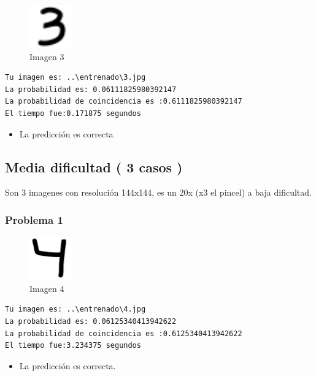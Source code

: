 \documentclass[
  spanish,
]{article}
\providecommand{\tightlist}{%
  \setlength{\itemsep}{0pt}\setlength{\parskip}{0pt}}
\begin{document}
\begin{figure}
\centering
\includegraphics[width=0.72917in,height=\textheight]{documentacion/img/3.png}
\caption{Imagen 3}
\end{figure}

\begin{verbatim}
Tu imagen es: ..\entrenado\3.jpg
La probabilidad es: 0.06111825980392147
La probabilidad de coincidencia es :0.6111825980392147
El tiempo fue:0.171875 segundos
\end{verbatim}

\begin{itemize}
\tightlist
\item
  La predicción es correcta
\end{itemize}

\hypertarget{media-dificultad-3-casos}{%
\subsection{Media dificultad ( 3 casos
)}\label{media-dificultad-3-casos}}

Son 3 imagenes con resolución 144x144, es un 20x (x3 el pincel) a baja
dificultad.

\hypertarget{problema-1-1}{%
\subsubsection{Problema 1}\label{problema-1-1}}

\begin{figure}
\centering
\includegraphics[width=0.72917in,height=\textheight]{documentacion/img/4.png}
\caption{Imagen 4}
\end{figure}

\begin{verbatim}
Tu imagen es: ..\entrenado\4.jpg
La probabilidad es: 0.06125340413942622
La probabilidad de coincidencia es :0.6125340413942622
El tiempo fue:3.234375 segundos
\end{verbatim}

\begin{itemize}
\tightlist
\item
  La predicción es correcta.
\end{itemize}
\end{document}
